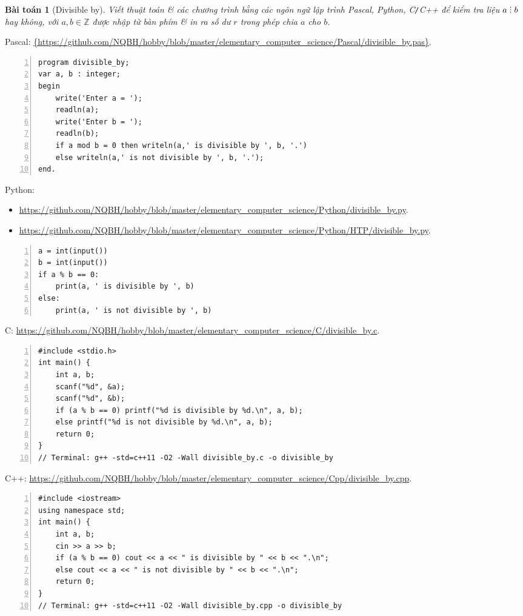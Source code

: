 \documentclass{article}
\newtheorem{baitoan}{Bài toán}
\DeclareRobustCommand{\divby}{%
	\mathrel{\vbox{\baselineskip.65ex\lineskiplimit0pt\hbox{.}\hbox{.}\hbox{.}}}%
}
\begin{document}
\begin{baitoan}[Divisible by]
	Viết thuật toán \& các chương trình bằng các ngôn ngữ lập trình {\sf Pascal, Python, C{\tt /}C++} để kiểm tra liệu $a\divby b$ hay không, với $a,b\in\mathbb{Z}$ được nhập từ bàn phím \& in ra số dư $r$ trong phép chia $a$ cho $b$.
\end{baitoan}
\noindent Pascal: \url{{https://github.com/NQBH/hobby/blob/master/elementary_computer_science/Pascal/divisible_by.pas}}.
\begin{Verbatim}[numbers=left,xleftmargin=5mm]
program divisible_by;
var a, b : integer;
begin
    write('Enter a = ');
    readln(a);
    write('Enter b = ');
    readln(b);
    if a mod b = 0 then writeln(a,' is divisible by ', b, '.')
    else writeln(a,' is not divisible by ', b, '.');
end.
\end{Verbatim}
Python:
\begin{itemize}
	\item \url{https://github.com/NQBH/hobby/blob/master/elementary_computer_science/Python/divisible_by.py}.
	\item \url{https://github.com/NQBH/hobby/blob/master/elementary_computer_science/Python/HTP/divisible_by.py}.
\end{itemize} 
\begin{Verbatim}[numbers=left,xleftmargin=5mm]
a = int(input())
b = int(input())
if a % b == 0:
    print(a, ' is divisible by ', b)
else:
    print(a, ' is not divisible by ', b)
\end{Verbatim}
C: \url{https://github.com/NQBH/hobby/blob/master/elementary_computer_science/C/divisible_by.c}.
\begin{Verbatim}[numbers=left,xleftmargin=5mm]
#include <stdio.h>
int main() {
    int a, b;
    scanf("%d", &a);
    scanf("%d", &b);
    if (a % b == 0) printf("%d is divisible by %d.\n", a, b);
    else printf("%d is not divisible by %d.\n", a, b);
    return 0;
}
// Terminal: g++ -std=c++11 -O2 -Wall divisible_by.c -o divisible_by
\end{Verbatim}
C++: \url{https://github.com/NQBH/hobby/blob/master/elementary_computer_science/Cpp/divisible_by.cpp}.
\begin{Verbatim}[numbers=left,xleftmargin=5mm]
#include <iostream>
using namespace std;
int main() {
    int a, b;
    cin >> a >> b;
    if (a % b == 0) cout << a << " is divisible by " << b << ".\n";
    else cout << a << " is not divisible by " << b << ".\n";
    return 0;
}
// Terminal: g++ -std=c++11 -O2 -Wall divisible_by.cpp -o divisible_by
\end{Verbatim}
\end{document}

